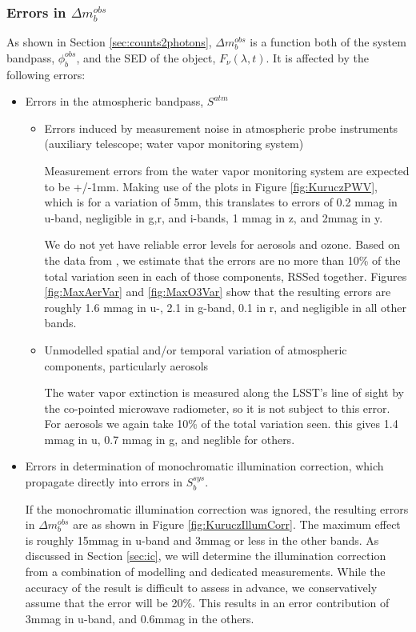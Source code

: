 \documentclass[12pt,preprint]{aastex}
\begin{document}
\subsubsection{Errors in $\Delta m_b^{obs}$}
As shown in Section \ref{sec:counts2photons}, $\Delta m_b^{obs}$ is a function both of the system bandpass, $\phi_b^{obs}$, and the SED of the object, $F_{\nu}(\lambda, t)$.   It is affected by the following errors:
\begin{itemize}
\item{Errors in the atmospheric bandpass, $S^{atm}$
	\begin{itemize}
	\item{Errors induced by measurement noise in atmospheric probe instruments (auxiliary telescope; water vapor monitoring system)}
	
	Measurement errors from the water vapor monitoring system are expected to be +/-1mm.  Making use of the plots in 
	Figure \ref{fig:KuruczPWV}, which is for a variation of 5mm, this translates to errors of 0.2 mmag in u-band, 
	negligible in g,r, and i-bands, 1 mmag in z, and 2mmag in y.
	
	We do not yet have reliable error levels for aerosols and ozone.  Based on the data from \citep{Burke2010b},
	we estimate that the errors are no more than 10\% of the total variation seen in each of those components,
	RSSed together.  
	Figures \ref{fig:MaxAerVar} and \ref{fig:MaxO3Var} show that the resulting errors are roughly 1.6 mmag in u-, 2.1 in g-band, 
	0.1 in r, and negligible in all other bands.
	 
	\item{Unmodelled spatial and/or temporal variation of atmospheric components, particularly aerosols}
	
	The water vapor extinction is measured along the LSST's line of sight by the co-pointed microwave radiometer, so it is 
	not subject to this error.  For aerosols we again take 10\% of the total variation seen.  this gives 1.4 mmag in u, 
	0.7 mmag in g, and neglible for others.
	
	
	\end{itemize}
	}
\item{Errors in determination of monochromatic illumination correction, which propagate directly into errors in $S_b^{sys}$.  

If the monochromatic illumination correction was ignored, the resulting errors in $\Delta m_b^{obs}$ are as shown in Figure \ref{fig:KuruczIllumCorr}.  The maximum effect is roughly 15mmag in u-band and 3mmag or less in the other bands.  As discussed in Section \ref{sec:ic}, we will determine the illumination correction from a combination of modelling and dedicated measurements.
While the accuracy of the result is difficult to assess in advance, we conservatively assume that the error will be 20\%. 
This results in an error contribution of 3mmag in u-band, and 0.6mmag in the others.
}


\end{itemize}
\end{document}
